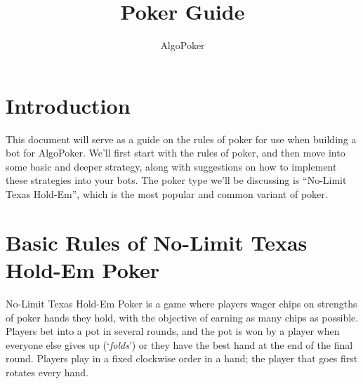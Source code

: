 \documentclass{article}
\title{Poker Guide}
\author{AlgoPoker}
\begin{document}
\maketitle
\tableofcontents
\newpage 
\section{Introduction}
This document will serve as a guide on the rules of poker for use when building a bot for AlgoPoker. We'll first start with the rules of poker, and then move into some basic and deeper strategy, along with suggestions on how to implement these strategies into your bots. The poker type we'll be discussing is ``No-Limit Texas Hold-Em'', which is the most popular and common variant of poker.
\section{Basic Rules of No-Limit Texas Hold-Em Poker}
No-Limit Texas Hold-Em Poker is a game where players wager chips on strengths of poker hands they hold, with the objective of earning as many chips as possible. Players bet into a pot in several rounds, and the pot is won by a player when everyone else gives up (`\emph{folds}') or they have the best hand at the end of the final round. Players play in a fixed clockwise order in a hand; the player that goes first rotates every hand. 
\end{document}
